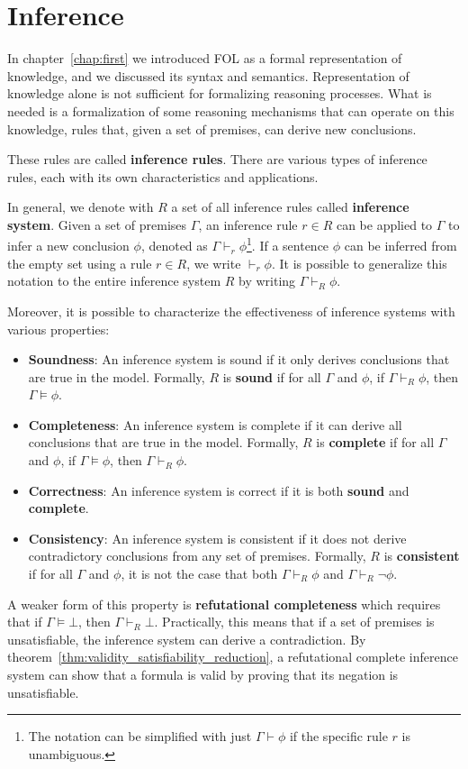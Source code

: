 \chapter{Inference}\label{chap:second}

In chapter~\ref{chap:first} we introduced FOL as a formal representation of knowledge, and we discussed its syntax and semantics.
Representation of knowledge alone is not sufficient for formalizing reasoning processes.
What is needed is a formalization of some reasoning mechanisms that can operate on this knowledge, rules that, given a set of premises, can derive new conclusions.

These rules are called \textbf{inference rules}.
There are various types of inference rules, each with its own characteristics and applications.

In general, we denote with \(R\) a set of all inference rules called \textbf{inference system}. Given a set of premises \(\Gamma\), an inference rule \(r \in R\) can be applied to \(\Gamma\) to infer a new conclusion \(\phi\), denoted as \(\Gamma \vdash_r \phi\)\footnote{
  The notation can be simplified with just \(\Gamma \vdash \phi\) if the specific rule \(r\) is unambiguous.}.
If a sentence \(\phi\) can be inferred from the empty set using a rule \(r \in R\), we write \(\vdash_r \phi\).
It is possible to generalize this notation to the entire inference system \(R\) by writing \(\Gamma \vdash_{R} \phi\).

Moreover, it is possible to characterize the effectiveness of inference systems with various properties:

\begin{itemize}
    \item \textbf{Soundness}: An inference system is sound if it only derives conclusions that are true in the model. Formally, \(R\) is \textbf{sound} if for all \(\Gamma\) and \(\phi\), if \(\Gamma \vdash_{R} \phi\), then \(\Gamma\models\phi\).
    \item \textbf{Completeness}: An inference system is complete if it can derive all conclusions that are true in the model. Formally, \(R\) is \textbf{complete} if for all \(\Gamma\) and \(\phi\), if \(\Gamma\models\phi\), then \(\Gamma \vdash_{R} \phi\).
    \item \textbf{Correctness}: An inference system is correct if it is both \textbf{sound} and \textbf{complete}.
    \item \textbf{Consistency}: An inference system is consistent if it does not derive contradictory conclusions from any set of premises. Formally, \(R\) is \textbf{consistent} if for all \(\Gamma\) and \(\phi\), it is not the case that both \(\Gamma \vdash_{R} \phi\) and \(\Gamma \vdash_{R} \neg \phi\).
\end{itemize}
A weaker form of this property is \textbf{refutational completeness} which requires that if \(\Gamma \models \bot\), then \(\Gamma \vdash_{R} \bot\).  Practically, this means that if a set of premises is unsatisfiable, the inference system can derive a contradiction.
By theorem~\ref{thm:validity_satisfiability_reduction}, a refutational complete inference system can show that a formula is valid by proving that its negation is unsatisfiable.

